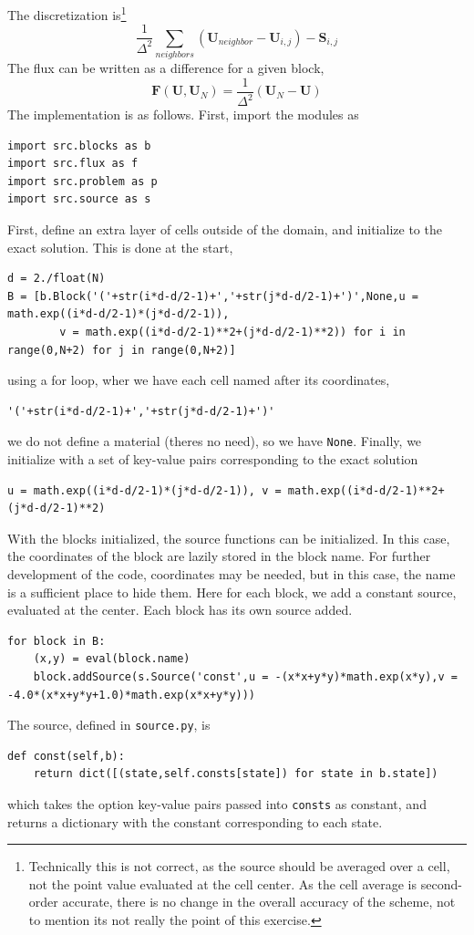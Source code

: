 \documentclass[11pt]{article}
\begin{document}
The discretization is\footnote{Technically this is not correct, as the source should be averaged over a cell, not the point value evaluated at the cell center. As the cell average is second-order accurate, there is no change in the overall accuracy of the scheme, not to mention its not really the point of this exercise.}
\begin{equation}
\frac{1}{\Delta^2}\sum_{neighbors} (\mathbf{U}_{neighbor}-\mathbf{U}_{i,j}) - \mathbf{S}_{i,j}
\end{equation}
The flux can be written as a difference for a given block,
\begin{equation}
\mathbf{F}(\mathbf{U},\mathbf{U}_N) = \frac{1}{\Delta^2}(\mathbf{U}_N - \mathbf{U})
\end{equation}
The implementation is as follows. First, import the modules as
\begin{lstlisting}
import src.blocks as b
import src.flux as f
import src.problem as p
import src.source as s
\end{lstlisting}

First, define an extra layer of cells outside of the domain, and initialize to the exact solution. This is done at the start,

\begin{lstlisting}
d = 2./float(N)
B = [b.Block('('+str(i*d-d/2-1)+','+str(j*d-d/2-1)+')',None,u = math.exp((i*d-d/2-1)*(j*d-d/2-1)),
		v = math.exp((i*d-d/2-1)**2+(j*d-d/2-1)**2)) for i in range(0,N+2) for j in range(0,N+2)]
\end{lstlisting}
using a for loop, wher we have each cell named after its coordinates,
\begin{lstlisting}
'('+str(i*d-d/2-1)+','+str(j*d-d/2-1)+')'
\end{lstlisting}we do not define a material (theres no need), so we have \lstinline{None}. Finally, we initialize with a set of key-value pairs corresponding to the exact solution
\begin{lstlisting}
u = math.exp((i*d-d/2-1)*(j*d-d/2-1)), v = math.exp((i*d-d/2-1)**2+(j*d-d/2-1)**2)
\end{lstlisting}
With the blocks initialized, the source functions can be initialized. In this case, the coordinates of the block are lazily stored in the block name. For further development of the code, coordinates may be needed, but in this case, the name is a sufficient place to hide them. Here for each block, we add a constant source, evaluated at the center. Each block has its own source added.
\begin{lstlisting}
for block in B:
	(x,y) = eval(block.name)
	block.addSource(s.Source('const',u = -(x*x+y*y)*math.exp(x*y),v = -4.0*(x*x+y*y+1.0)*math.exp(x*x+y*y)))
\end{lstlisting}
The source, defined in \lstinline{source.py}, is 
\begin{lstlisting}
def const(self,b):
	return dict([(state,self.consts[state]) for state in b.state])
\end{lstlisting}
which takes the option key-value pairs passed into \lstinline{consts} as constant, and returns a dictionary with the constant corresponding to each state.
\end{document}

